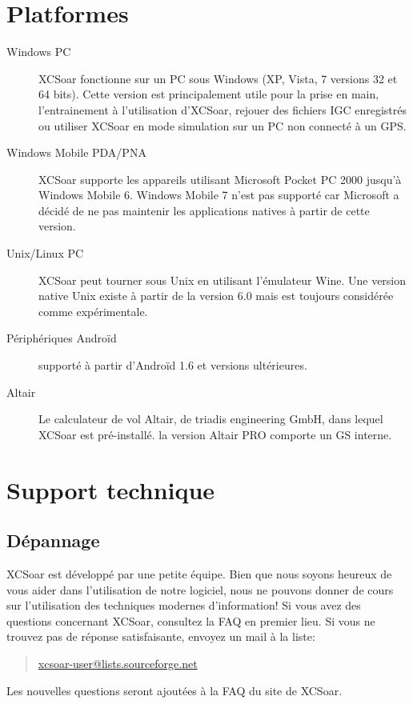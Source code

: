 \section{Platformes}
\begin{description}
\item[Windows PC]
XCSoar fonctionne sur un PC sous Windows (XP, Vista, 7 versions 32 et 64 bits). Cette version est principalement utile pour la prise en main, l'entrainement à l'utilisation d'XCSoar, rejouer des fichiers IGC enregistrés ou utiliser XCSoar en mode simulation sur un PC non connecté à un GPS.
\item[Windows Mobile PDA/PNA]
XCSoar supporte les appareils utilisant Microsoft Pocket PC 2000 jusqu'à Windows Mobile 6. Windows Mobile 7 n'est pas supporté car Microsoft a décidé de ne pas maintenir les applications natives à partir de cette version.
\item[Unix/Linux PC]
XCSoar peut tourner sous Unix en utilisant l'émulateur Wine. Une version native Unix existe à partir de la version 6.0 mais est toujours considérée comme expérimentale.
\item[Périphériques Androïd] supporté à partir d'Androïd 1.6 et versions ultérieures.
\item[Altair] Le calculateur de vol Altair, de triadis engineering GmbH, dans lequel XCSoar est pré-installé. la version Altair PRO comporte un GS interne.
\end{description}



\section{Support technique}

\subsection*{Dépannage}
XCSoar est développé par une petite équipe. Bien que nous soyons heureux de vous aider dans l'utilisation de notre logiciel, nous ne pouvons donner de cours sur l'utilisation des techniques modernes d'information!
Si vous avez des questions concernant XCSoar, consultez la FAQ en premier lieu. Si vous ne trouvez pas de réponse satisfaisante, envoyez un mail à la liste:
\begin{quote}
\href{mailto:xcsoar-user@lists.sourceforge.net}{xcsoar-user@lists.sourceforge.net}
\end{quote}

Les nouvelles questions seront ajoutées à la FAQ du site de XCSoar.

